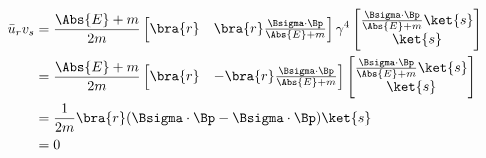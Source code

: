 \begin{align*}
\bar{u}_r v_s 
&= 
\frac{\Abs{E} + m}{2m}
\begin{bmatrix}
\bra{r} &
\bra{r} \frac{\Bsigma \cdot \Bp}{\Abs{E} + m} 
\end{bmatrix}
\gamma^4
\begin{bmatrix}
\frac{\Bsigma \cdot \Bp}{\Abs{E} + m} \ket{s} \\
\ket{s} 
\end{bmatrix} \\
&= 
\frac{\Abs{E} + m}{2m}
\begin{bmatrix}
\bra{r} &
-\bra{r} \frac{\Bsigma \cdot \Bp}{\Abs{E} + m} 
\end{bmatrix}
\begin{bmatrix}
\frac{\Bsigma \cdot \Bp}{\Abs{E} + m} \ket{s} \\
\ket{s} 
\end{bmatrix} \\
&=
\frac{1}{2m}
\bra{r} ( \Bsigma \cdot \Bp - \Bsigma \cdot \Bp ) \ket{s} \\
&= 0
\end{align*}

\EndArticle
